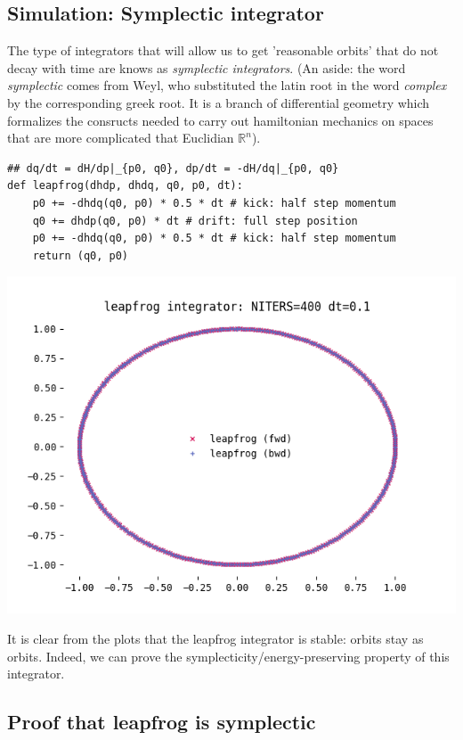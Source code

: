 \documentclass[titlepage]{article}
\newcommand{\R}{\mathbb{R}}
\begin{document}
\subsection{Simulation: Symplectic integrator}

The type of integrators that will allow us to get 'reasonable orbits' that
do not decay with time are knows as \emph{symplectic integrators}.
(An aside: the word \emph{symplectic} comes from Weyl, who substituted
the latin root in the word \emph{complex} by the corresponding greek root.
It is a branch of differential geometry which formalizes the consructs
needed to carry out hamiltonian mechanics on spaces that are more complicated
that Euclidian $\R^n$).

\begin{verbatim}
## dq/dt = dH/dp|_{p0, q0}, dp/dt = -dH/dq|_{p0, q0}
def leapfrog(dhdp, dhdq, q0, p0, dt):
    p0 += -dhdq(q0, p0) * 0.5 * dt # kick: half step momentum
    q0 += dhdp(q0, p0) * dt # drift: full step position
    p0 += -dhdq(q0, p0) * 0.5 * dt # kick: half step momentum
    return (q0, p0)
\end{verbatim}


\includegraphics[width=\textwidth/2]{./leapfrog-dt-0-1.png}

It is clear from the plots that the leapfrog integrator is stable: orbits
stay as orbits. Indeed, we can prove the symplecticity/energy-preserving
property of this integrator.

\subsection{Proof that leapfrog is symplectic}
\end{document}
